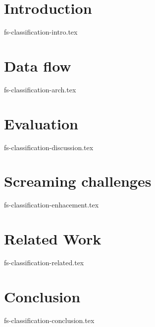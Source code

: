\documentclass[sigconf]{acmart}
\theoremstyle{remark}
\begin{document}
\section {Introduction}
 {fs-classification-intro.tex}

\section {Data flow}
 {fs-classification-arch.tex}

\section {Evaluation}
 {fs-classification-discussion.tex}

\section {Screaming challenges}
 {fs-classification-enhacement.tex}

\section{Related Work}
 {fs-classification-related.tex}

\section {Conclusion}
 {fs-classification-conclusion.tex}



\end{document}
